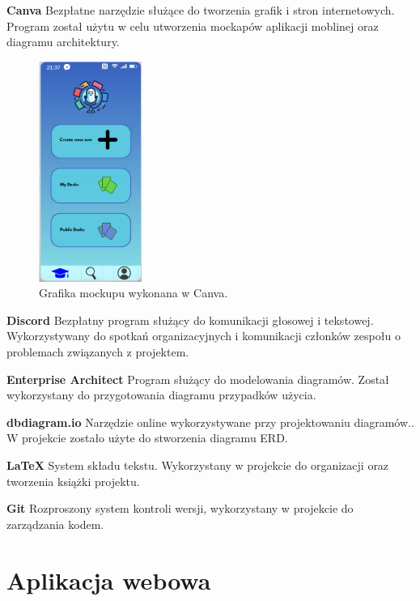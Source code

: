 \textbf{Canva} Bezpłatne narzędzie służące do tworzenia grafik i stron internetowych. Program został użytu w celu utworzenia mockapów aplikacji moblinej oraz diagramu architektury.

\begin{figure}[H]
    \centering
    \includegraphics[width=0.3\textwidth]{chapters/chapter_7/canva.png}
    \caption{Grafika mockupu wykonana w Canva.}
    \label{img:canva}
\end{figure}


\textbf{Discord} Bezpłatny program służący do komunikacji głosowej i tekstowej. Wykorzystywany do spotkań organizacyjnych i komunikacji członków zespołu o problemach związanych z projektem.

\medskip

\textbf{Enterprise Architect} Program służący do modelowania diagramów. Został wykorzystany do przygotowania diagramu przypadków użycia.

\medskip

\textbf{dbdiagram.io} Narzędzie online wykorzystywane przy projektowaniu diagramów.. W projekcie zostało użyte do stworzenia diagramu ERD.

\medskip

\textbf{LaTeX} System składu tekstu. Wykorzystany w projekcie do organizacji oraz tworzenia książki projektu.

\medskip

\textbf{Git} Rozproszony system kontroli wersji, wykorzystany w projekcie do zarządzania kodem.

\section{Aplikacja webowa}

